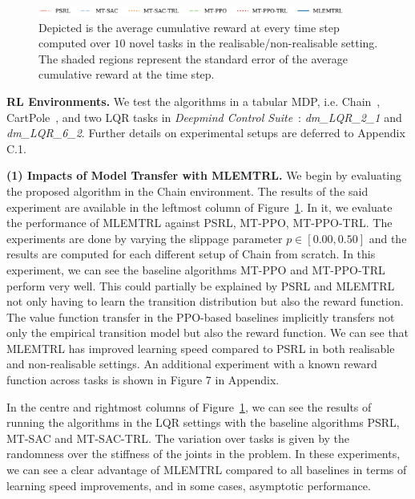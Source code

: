 \begin{figure}[t!]
    \includegraphics[width=0.9\textwidth]{img/lqr_legend.pdf}
    \caption{Depicted is the average cumulative reward at every time step computed over $10$ novel tasks in the realisable/non-realisable setting. The shaded regions represent the standard error of the average cumulative reward at the time step.}\label{fig:full_results}%
\end{figure}


\noindent\textbf{RL Environments.} We test the algorithms in a tabular MDP, i.e. Chain~\citep{dearden1998bayesian}, CartPole~\citep{barto1983neuronlike}, and two LQR tasks in \emph{Deepmind Control Suite}~\citep{tassa2018deepmind}: \emph{dm\_LQR\_2\_1} and \emph{dm\_LQR\_6\_2}. %
Further details on experimental setups are deferred to Appendix C.1.


\noindent\textbf{(1) Impacts of Model Transfer with MLEMTRL.}\label{sec:impacts} We begin by evaluating the proposed algorithm in the Chain environment. The results of the said experiment are available in the leftmost column of Figure~\ref{fig:full_results}. In it, we evaluate the performance of MLEMTRL against PSRL, MT-PPO, MT-PPO-TRL. The experiments are done by varying the slippage parameter $p \in [0.00, 0.50]$ and the results are computed for each different setup of Chain from scratch. In this experiment, we can see the baseline algorithms MT-PPO and MT-PPO-TRL perform very well. This could partially be explained by PSRL and MLEMTRL not only having to learn the transition distribution but also the reward function. The value function transfer in the PPO-based baselines implicitly transfers not only the empirical transition model but also the reward function. We can see that MLEMTRL has improved learning speed compared to PSRL in both realisable and non-realisable settings. 
An additional experiment with a known reward function across tasks is shown in %
Figure 7 in Appendix.

In the centre and rightmost columns of Figure~\ref{fig:full_results}, we can see the results of running the algorithms in the LQR settings with the baseline algorithms PSRL, MT-SAC and MT-SAC-TRL. The variation over tasks is given by the randomness over the stiffness of the joints in the problem. In these experiments, we can see a clear advantage of MLEMTRL compared to all baselines in terms of learning speed improvements, and in some cases, asymptotic performance.

